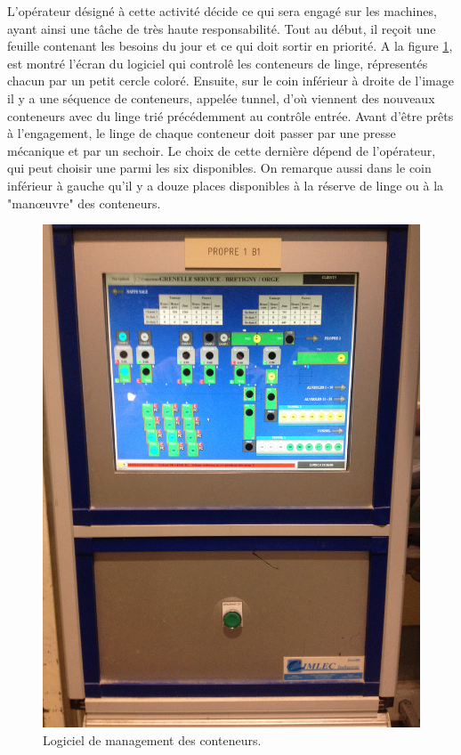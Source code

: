 \documentclass{article}
\newcommand{\rapportFigure}{0.075}
\begin{document}
L'opérateur désigné à cette activité décide ce qui sera engagé sur
les machines, ayant ainsi une tâche de très haute responsabilité. Tout au début,
il reçoit une feuille contenant les besoins du jour et ce qui doit sortir en
priorité. A la figure \ref{fig:management}, est montré l'écran du logiciel qui
controlê les conteneurs de linge, répresentés chacun par un petit cercle
coloré. Ensuite, sur le coin inférieur à droite de l'image il y a une séquence
de conteneurs, appelée tunnel, d'où viennent des nouveaux conteneurs avec du linge
trié précédemment au contrôle entrée. Avant d'être prêts à l'engagement, le
linge de chaque conteneur doit passer par une presse mécanique et par un
sechoir. Le choix de cette dernière dépend de l'opérateur, qui peut choisir une
parmi les six disponibles. On remarque aussi dans le coin inférieur à gauche
qu'il y a douze places disponibles à la réserve de linge ou à la "man\oe uvre"
des conteneurs.

\FloatBarrier

%
\begin{figure}[h]
    \centering
    \includegraphics[angle = -90, scale= \rapportFigure]{images/restau_management}
    \caption{Logiciel de management des conteneurs.}
    \label{fig:management}
\end{figure}
\end{document}

